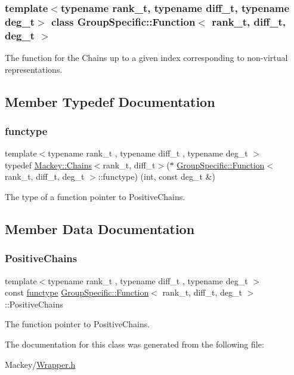 \subsubsection*{template$<$typename rank\+\_\+t, typename diff\+\_\+t, typename deg\+\_\+t$>$\newline
class Group\+Specific\+::\+Function$<$ rank\+\_\+t, diff\+\_\+t, deg\+\_\+t $>$}

The function for the Chains up to a given index corresponding to non-\/virtual representations. 

\subsection{Member Typedef Documentation}
\mbox{\label{classGroupSpecific_1_1Function_a73d984ea6bf824b9112d0cf978a46741}} 
\subsubsection{\texorpdfstring{functype}{functype}}
{\footnotesize\ttfamily template$<$typename rank\+\_\+t , typename diff\+\_\+t , typename deg\+\_\+t $>$ \\
typedef \hyperlink{classMackey_1_1Chains}{Mackey\+::\+Chains}$<$rank\+\_\+t, diff\+\_\+t$>$($\ast$ \hyperlink{classGroupSpecific_1_1Function}{Group\+Specific\+::\+Function}$<$ rank\+\_\+t, diff\+\_\+t, deg\+\_\+t $>$\+::functype) (int, const deg\+\_\+t \&)}



The type of a function pointer to Positive\+Chains. 



\subsection{Member Data Documentation}
\mbox{\label{classGroupSpecific_1_1Function_a6d247b31d297f733e9cd6f68921a37cd}} 
\subsubsection{\texorpdfstring{Positive\+Chains}{PositiveChains}}
{\footnotesize\ttfamily template$<$typename rank\+\_\+t , typename diff\+\_\+t , typename deg\+\_\+t $>$ \\
const \hyperlink{classGroupSpecific_1_1Function_a73d984ea6bf824b9112d0cf978a46741}{functype} \hyperlink{classGroupSpecific_1_1Function}{Group\+Specific\+::\+Function}$<$ rank\+\_\+t, diff\+\_\+t, deg\+\_\+t $>$\+::Positive\+Chains\hspace{0.3cm}{\ttfamily [static]}}



The function pointer to Positive\+Chains. 



The documentation for this class was generated from the following file\+:\begin{DoxyCompactItemize}
\item 
Mackey/\hyperlink{Wrapper_8h}{Wrapper.\+h}\end{DoxyCompactItemize}
